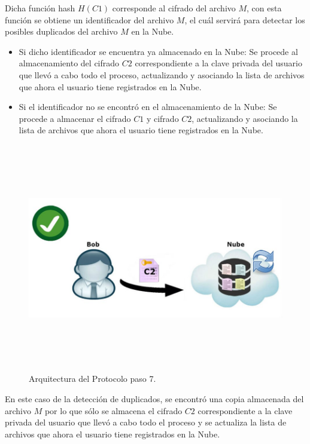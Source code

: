 Dicha función hash $H(C1)$ corresponde al cifrado del archivo $M$, con esta función se obtiene un identificador del archivo $M$, el cuál servirá para detectar los posibles duplicados del archivo $M$ en la Nube.

\begin{itemize}
	\item Si dicho identificador se encuentra ya almacenado en la Nube: Se procede al almacenamiento del cifrado $C2$ correspondiente a la clave privada del usuario que llevó a cabo todo el proceso, actualizando y asociando la lista de archivos que ahora el usuario tiene registrados en la Nube.
	\item Si el identificador no se encontró en el almacenamiento de la Nube: Se procede a almacenar el cifrado $C1$ y cifrado $C2$, actualizando y asociando la lista de archivos que ahora el usuario tiene registrados en la Nube.
\end{itemize}




\begin{figure}[H]
\centering
\includegraphics[width=16cm, height=10cm]{./images/Paso06.jpg}
\caption{Arquitectura del Protocolo paso 7.}

\end{figure}

En este caso de la detección de duplicados, se encontró una copia almacenada del archivo $M$ por lo que sólo se almacena el cifrado $C2$ correspondiente a la clave privada del usuario que llevó a cabo todo el proceso y se actualiza la lista de archivos que ahora el usuario tiene registrados en la Nube.


